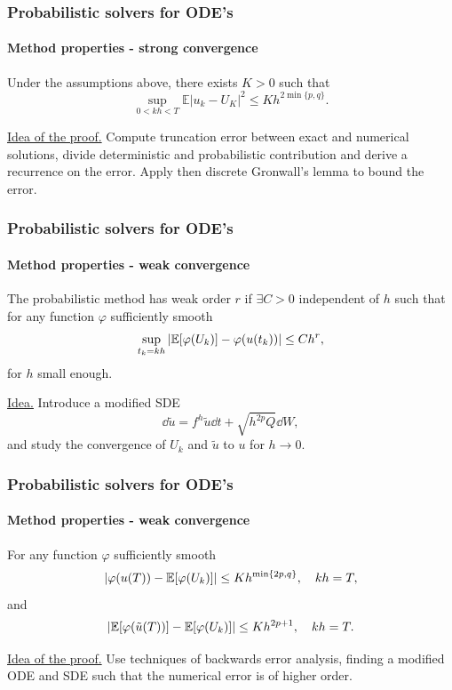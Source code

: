 \documentclass{beamer}
\newcommand{\E}{\mathbb{E}}
\renewcommand{\phi}{\varphi}
\begin{document}
\begin{frame}
	\frametitle{Probabilistic solvers for ODE's}
	\framesubtitle{Method properties - strong convergence \cite{CGS16}}
	
	\begin{theorem} Under the assumptions above, there exists $K>0$ such that
		\begin{equation*}
		\sup_{0<kh<T} \E|u_k - U_K|^2 \leq Kh^{2\min\{p,q\}}.
		\end{equation*}
	\end{theorem}
	
	\underline{Idea of the proof.} Compute truncation error between exact and numerical solutions, divide deterministic and probabilistic contribution and derive a recurrence on the error. Apply then discrete Gronwall's lemma to bound the error.
\end{frame}

\begin{frame}
	\frametitle{Probabilistic solvers for ODE's}
	\framesubtitle{Method properties - weak convergence \cite{CGS16}}

	\begin{definition} The probabilistic method has weak order $r$ if $\exists C > 0$ independent of $h$ such that for any function $\phi$ sufficiently smooth
		\begin{equation*}
		\sup_{t_k = kh} \abs{\E[\phi(U_k)] - \phi(u(t_k))} \leq Ch^r,
		\end{equation*}
		for $h$ small enough.
	\end{definition}
	
	\underline{Idea.} Introduce a modified SDE 
	\begin{equation*}
		\dd{\tilde u} = f^h{\tilde u}\dd{t} + \sqrt{h^{2p} Q} \dd{W},
	\end{equation*}
	and study the convergence of $U_k$ and $\tilde u$ to $u$ for $h \to 0$.
\end{frame}

\begin{frame}
	\frametitle{Probabilistic solvers for ODE's}
	\framesubtitle{Method properties - weak convergence \cite{CGS16}}

	\begin{theorem} For any function $\phi$ sufficiently smooth
		\begin{equation*}
		\abs{\phi(u(T)) - \E[\phi(U_k)]} \leq Kh^{\min\{2p, q\}}, \quad kh = T,
		\end{equation*}
		and 
		\begin{equation*}
		\abs{\E[\phi(\tilde u(T))] - \E[\phi(U_k)]} \leq Kh^{2p + 1}, \quad kh = T.
		\end{equation*}
	\end{theorem}
	
	\underline{Idea of the proof.} Use techniques of backwards error analysis, finding a modified ODE and SDE such that the numerical error is of higher order.
	
\end{frame}
\end{document}

